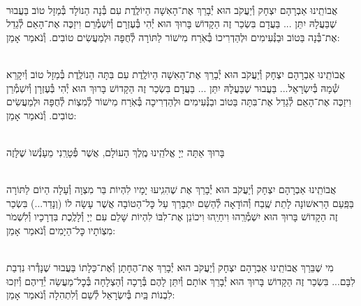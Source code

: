 \documentclass[twoside, openany, parskip=half, 11pt]{book}
\begin{document}
\begin{sometimes}



\\
אֲבוֹתֵֽינוּ אַבְרָהָם יִצְחָק וְ֯יַעֲקֹב הוּא יְ֯בָרֵךְ אֶת־הָאִשָׁה הַיוֹלֶֽדֶת
עִם בְּ֯נָה הַנוֹלָד בְּ֯מַזָל טוֹב בַּעֲבוּר שֶׁבַּעֲלָהּ יִתֵּן ... בַּעֲדָם בִּשְׂכַר זֶה הַקָדוֹשׁ בָּרוּךְ הוּא יְ֯הִי בְּ֯עֶזְרָם וְ֯יִשְׁמְ֯רֵם וִיזַכֶּה אֶת־הָאֵם לְ֯גַדֵל אֶת־בְּ֯נָה בַּטוֹב וּבַנְּ֯עִימִים וּלְהַדְרִיכוֹ בְּ֯אֹֽרַח מִישׁוֹר לַתּוֹרָה לְ֯חֻפָּה וּלְמַעֲשִׂים טוֹבִים. וְ֯נֹאמַר אָמֵן:



\\
אֲבוֹתֵֽינוּ אַבְרָהָם יִצְחָק וְ֯יַעֲקֹב הוּא יְ֯בָרֵךְ אֶת־הָאִשָׁה הַיוֹלֶֽדֶת
עִם בִּתָּה הַנוֹלֶֽדֶת בְּ֯מַזָל טוֹב וְ֯יִקָרֵא שְׁ֯מָהּ בְּ֯יִשְׂרָאֵל... בַּעֲבוּר שֶׁבַּעֲלָהּ יִתֵּן ... בַּעֲדָם בִּשְׂכַר זֶה הַקָדוֹשׁ בָּרוּךְ הוּא יְ֯הִי בְּ֯עֶזְרָן וְ֯יִשְׁמְ֯רֵן וִיזַכֶּה אֶת־הָאֵם לְ֯גַדֵל אֶת־בִּתָּה בַּטוֹב ובַנְּ֯עִימִים וּלְהַדְרִיכָה בְּ֯אֹֽרַח מִישׁוֹר לְ֯מִצְוֹת לְ֯חֻפָּה וּלְמַעֲשִׂים טוֹבִים. וְ֯נֹאמַר אָמֵן:

\\
בָּרוּךְ אַתָּה יְיָ אֱלֹהֵֽינוּ מֶֽלֶךְ הָעוֹלָם, אֲשֶׁר פְּ֯טָרַֽנִי מֵעָנְ֯שׁוׂ שֶׁלָּזֶה

\\
אֲבוֹתֵֽינוּ אַבְרָהָם יִצְחָק וְ֯יַעֲקֹב הוּא יְ֯בָרֵךְ אֶת
שֶׁהִגִֽיעוּ יָמָיו לִהְיוֹת בַּר מִצְוָה וְ֯עָלָה הַיוֹם לַתּוֹרָה בַּפַּֽעַם הָרִאשׁוֹנָה לָתֵת שֶֽׁבַח וְ֯הוֹדָאָה לְ֯הַשֵׁם יִתְבָּרַךְ עַל כׇּל־הַטוֹבָה אֲשֶׁר עָשָׂה לוֹ (וְנָדַר...) בִּשְׂכַר זֶה הַקָדוֹשׁ בָּרוּךְ הוּא יִשְׁמְ֯רֵֽהוּ וִיחַיֵֽהוּ וִיכוֹנֵן אֶת־לִבּוֹ לִהְיוֹת שָׁלֵם עִם יְיָ וְ֯לָלֶֽכֶת בִּדְרָכָיו וְ֯לִשְׁמֹר מִצְוֹתָיו כׇּל־הַיָמִים וְ֯נֹאמַר אָמֵן:


\\
מִי שֶׁבֵּרַךְ אֲבוֹתֵֽינוּ אַבְרָהָם יִצְחָק וְ֯יַעֲקֹב הוּא יְ֯בָרֵךְ אֶת־הֶחָתָן  וְ֯אֶת־כַּלָתוֹ בַּעֲבוּר שֶׁנָדְ֯רוּ נִדְבַת לִבָּם... בִּשְׂכַר זֶה הַקָדוֹשׁ בָּרוּךְ הוּא יְ֯בָרֵךְ אוֹתָם וְ֯יִתֵּן לָהֶם בְּ֯רָכָה וְ֯הַצְלָחָה בְּ֯כׇל־מַעֲשֵׂה יְ֯דֵיהֶם וְ֯יִזְכוּ לִבְנוֹת בַּֽיִת בְּ֯יִשְׂרָאֵל לְ֯שֵׁם וְ֯לִתְהִלָה וְ֯נֹאמַר אָמֵן:


\end{sometimes}
\end{document}
